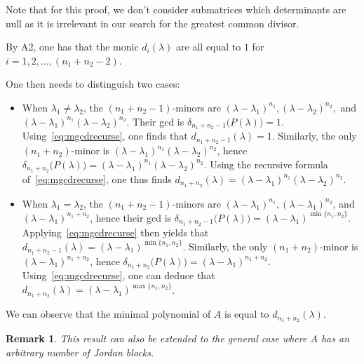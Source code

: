 \documentclass[11pt]{article}
\newtheorem*{remark}{Remark}
\begin{document}
Note that for this proof, we don't consider submatrices which determinants are null as it is irrelevant in our search for the greatest common divisor.

By A2, one has that the monic $d_i(\lambda)$ are all equal to \(1\) for $i = 1, 2, \dots, (n_1 + n_2 - 2)$.


One then needs to distinguish two cases:
\begin{itemize}
\item When $\lambda_1 \neq \lambda_2$, the \((n_1 + n_2 - 1)\)-minors are \((\lambda - \lambda_1)^{n_1},(\lambda - \lambda_2)^{n_2},\) and \((\lambda - \lambda_1)^{n_1}(\lambda - \lambda_2)^{n_2}\).
Their gcd is \(\delta_{n_1 + n_2 - 1}\big(P(\lambda)\big) = 1\).
Using~\eqref{eq:mgcdrecurse}, one finds that \(d_{n_1 + n_2 - 1}(\lambda) = 1\).
Similarly, the only \((n_1 + n_2)\)-minor is \((\lambda - \lambda_1)^{n_1}(\lambda - \lambda_2)^{n_2}\), hence \(\delta_{n_1 + n_2}\big(P(\lambda)\big) = (\lambda - \lambda_1)^{n_1}(\lambda - \lambda_2)^{n_2}\).
Using the recursive formula of~\eqref{eq:mgcdrecurse}, one thus finds \(d_{n_1 + n_2}(\lambda) = (\lambda - \lambda_1)^{n_1}(\lambda - \lambda_2)^{n_2}\).
\item When $\lambda_1 = \lambda_2$, the \((n_1 + n_2 - 1)\)-minors are \((\lambda - \lambda_1)^{n_1}, (\lambda - \lambda_1)^{n_2}\), and \((\lambda - \lambda_1)^{n_1 + n_2}\), hence their gcd is \(\delta_{n_1 + n_2 - 1}\big(P(\lambda)\big) = (\lambda - \lambda_1)^{\min\{n_1, n_2\}}\).
Applying~\eqref{eq:mgcdrecurse} then yields that \(d_{n_1 + n_2 - 1}(\lambda) = (\lambda - \lambda_1)^{\min\{n_1, n_2\}}\).
Similarly, the only \((n_1 + n_2)\)-minor is \((\lambda - \lambda_1)^{n_1 + n_2}\), hence \(\delta_{n_1 + n_2}\big(P(\lambda)\big) = (\lambda - \lambda_1)^{n_1 + n_2}\).
Using~\eqref{eq:mgcdrecurse}, one can deduce that \(d_{n_1 + n_2}(\lambda) = (\lambda - \lambda_1)^{\max\{n_1, n_2\}}\).
\end{itemize}

We can observe that the minimal polynomial of $A$ is equal to $d_{n_1+n_2}(\lambda)$.

\begin{remark}
This result can also be extended to the general case where \(A\) has an arbitrary number of Jordan blocks.
\end{remark}
\end{document}
